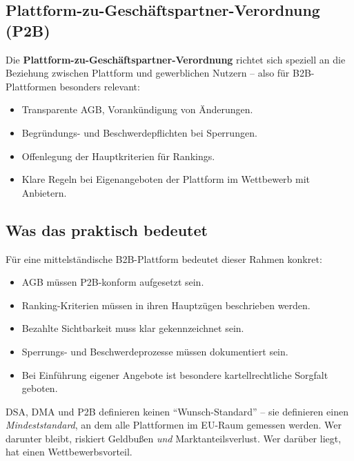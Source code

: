 \documentclass[11pt,a4paper,oneside]{article}
\newcommand{\fachbegriff}[1]{\textbf{#1}}
\begin{document}
\subsection{Plattform-zu-Geschäftspartner-Verordnung (P2B)}

Die \fachbegriff{Plattform-zu-Geschäftspartner-Verordnung} richtet sich speziell an die Beziehung zwischen Plattform und gewerblichen Nutzern -- also für B2B-Plattformen besonders relevant:

\begin{itemize}
  \item Transparente AGB, Vorankündigung von Änderungen.
  \item Begründungs- und Beschwerdepflichten bei Sperrungen.
  \item Offenlegung der Hauptkriterien für Rankings.
  \item Klare Regeln bei Eigenangeboten der Plattform im Wettbewerb mit Anbietern.
\end{itemize}

\subsection{Was das praktisch bedeutet}

Für eine mittelständische B2B-Plattform bedeutet dieser Rahmen konkret:

\begin{itemize}
  \item AGB müssen P2B-konform aufgesetzt sein.
  \item Ranking-Kriterien müssen in ihren Hauptzügen beschrieben werden.
  \item Bezahlte Sichtbarkeit muss klar gekennzeichnet sein.
  \item Sperrungs- und Beschwerdeprozesse müssen dokumentiert sein.
  \item Bei Einführung eigener Angebote ist besondere kartellrechtliche Sorgfalt geboten.
\end{itemize}

\begin{merkbox}
DSA, DMA und P2B definieren keinen ``Wunsch-Standard'' -- sie definieren einen \emph{Mindeststandard}, an dem alle Plattformen im EU-Raum gemessen werden. Wer darunter bleibt, riskiert Geldbußen \emph{und} Marktanteilsverlust. Wer darüber liegt, hat einen Wettbewerbsvorteil.
\end{merkbox}

\end{document}
